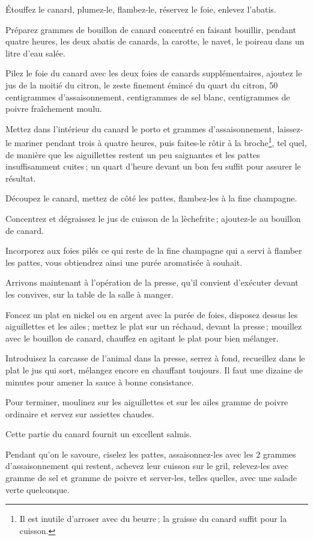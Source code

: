 Étouffez le canard, plumez-le, flambez-le, réservez le foie, enlevez l'abatis.

Préparez {\mmm} grammes de bouillon de canard concentré en faisant bouillir,
pendant quatre heures, les deux abatis de canards, la carotte, le navet, le
poireau dans un litre d'eau salée.

Pilez le foie du canard avec les deux foies de canards supplémentaires, ajoutez
le jus de la moitié du citron, le zeste finement émincé du quart du citron, 50
centigrammes d’assaisonnement, {\mmm} centigrammes de sel blanc, {\mmm} centigrammes de
poivre fraîchement moulu.

Mettez dans l'intérieur du canard le porto et {\mmm} grammes d'assaisonnement,
laissez-le mariner pendant trois à quatre heures, puis faites-le rôtir à la
broche\footnote{Il est inutile d'arroser avec du beurre ; la graisse du canard
suffit pour la cuisson.}, tel quel, de manière que les aiguillettes restent un
peu saignantes et les pattes insuffisamment cuites ; un quart d'heure devant un
bon feu suffit pour assurer le résultat.

Découpez le canard, mettez de côté les pattes, flambez-les à la fine champagne.

Concentrez et dégraissez le jus de cuisson de la lèchefrite ; ajoutez-le au
bouillon de canard.

Incorporez aux foies pilés ce qui reste de la fine champagne qui a servi
à flamber les pattes, vous obtiendrez ainsi une purée aromatisée à souhait.

Arrivons maintenant à l'opération de la presse, qu'il convient d'exécuter devant
les convives, sur la table de la salle à manger.

Foncez un plat en nickel ou en argent avec la purée de foies, disposez dessus
les aiguillettes et les ailes ; mettez le plat sur un réchaud, devant la
presse ; mouillez avec le bouillon de canard, chauffez en agitant le plat pour
bien mélanger.

Introduisez la carcasse de l'animal dans la presse, serrez à fond, recueillez
dans le plat le jus qui sort, mélangez encore en chauffant toujours. Il faut
une dizaine de minutes pour amener la sauce à bonne consistance.

Pour terminer, moulinez sur les aiguillettes et sur les ailes {\mmm} gramme de poivre
ordinaire et servez sur assiettes chaudes.

Cette partie du canard fournit un excellent salmis.

Pendant qu'on le savoure, ciselez les pattes, assaisonnez-les avec les
2 grammes d'assaisonnement qui restent, achevez leur cuisson sur le gril,
relevez-les avec {\mmm} gramme de sel et {\mmm} gramme de poivre et server-les, telles
quelles, avec une salade verte quelconque.

